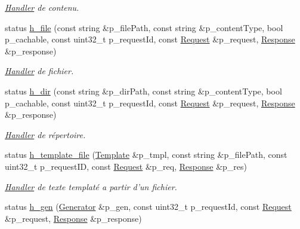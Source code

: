\begin{DoxyCompactItemize}
\begin{DoxyCompactList}\small\item\em \hyperlink{classxtd_1_1network_1_1http_1_1Server_1_1Handler}{Handler} de contenu. \end{DoxyCompactList}\item 
status \hyperlink{classxtd_1_1network_1_1http_1_1Server_a4358a20d2246a84f67d299f385c5bce8}{h\-\_\-file} (const string \&p\-\_\-file\-Path, const string \&p\-\_\-content\-Type, bool p\-\_\-cachable, const uint32\-\_\-t p\-\_\-request\-Id, const \hyperlink{classxtd_1_1network_1_1http_1_1Request}{Request} \&p\-\_\-request, \hyperlink{classxtd_1_1network_1_1http_1_1Response}{Response} \&p\-\_\-response)
\begin{DoxyCompactList}\small\item\em \hyperlink{classxtd_1_1network_1_1http_1_1Server_1_1Handler}{Handler} de fichier. \end{DoxyCompactList}\item 
status \hyperlink{classxtd_1_1network_1_1http_1_1Server_a71d7415223786f5451ef36f62c91782e}{h\-\_\-dir} (const string \&p\-\_\-dir\-Path, const string \&p\-\_\-content\-Type, bool p\-\_\-cachable, const uint32\-\_\-t p\-\_\-request\-Id, const \hyperlink{classxtd_1_1network_1_1http_1_1Request}{Request} \&p\-\_\-request, \hyperlink{classxtd_1_1network_1_1http_1_1Response}{Response} \&p\-\_\-response)
\begin{DoxyCompactList}\small\item\em \hyperlink{classxtd_1_1network_1_1http_1_1Server_1_1Handler}{Handler} de répertoire. \end{DoxyCompactList}\item 
status \hyperlink{classxtd_1_1network_1_1http_1_1Server_a28cc571d0a2e9a88abde8da286ad6a77}{h\-\_\-template\-\_\-file} (\hyperlink{classxtd_1_1network_1_1http_1_1Template}{Template} \&p\-\_\-tmpl, const string \&p\-\_\-file\-Path, const uint32\-\_\-t p\-\_\-request\-I\-D, const \hyperlink{classxtd_1_1network_1_1http_1_1Request}{Request} \&p\-\_\-req, \hyperlink{classxtd_1_1network_1_1http_1_1Response}{Response} \&p\-\_\-res)
\begin{DoxyCompactList}\small\item\em \hyperlink{classxtd_1_1network_1_1http_1_1Server_1_1Handler}{Handler} de texte templaté a partir d'un fichier. \end{DoxyCompactList}\item 
status \hyperlink{classxtd_1_1network_1_1http_1_1Server_ab1be437b8993afc7875d94a6abbc9bad}{h\-\_\-gen} (\hyperlink{classxtd_1_1network_1_1http_1_1Generator}{Generator} \&p\-\_\-gen, const uint32\-\_\-t p\-\_\-request\-Id, const \hyperlink{classxtd_1_1network_1_1http_1_1Request}{Request} \&p\-\_\-request, \hyperlink{classxtd_1_1network_1_1http_1_1Response}{Response} \&p\-\_\-response)

\end{DoxyCompactItemize}
